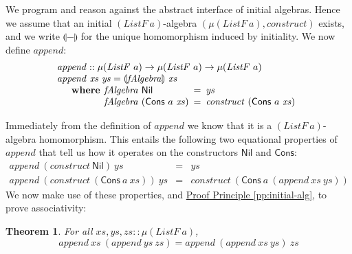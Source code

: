 \documentclass{jfp1}
\newcommand{\fold}[1]{\llparenthesis #1 \rrparenthesis}
\newtheorem{theorem}{Theorem}
\newcommand{\proofprinref}[1]{\hyperref[#1]{Proof Principle \ref*{#1}}}
\newcommand{\kw}[1]{\textbf{#1}}
\begin{document}
We program and reason against the abstract interface of initial
algebras. Hence we assume that an initial $(\mathit{ListF}~a)$-algebra
$(\mu(\mathit{ListF}~a), \mathit{construct})$ exists, and we write
$\fold{-}$ for the unique homomorphism induced by initiality. We now
define $\mathit{append}$:
\begin{displaymath}
  \begin{array}{l}
    \mathit{append} :: \mu(\mathit{ListF}~a) \to \mu(\mathit{ListF}~a) \to \mu(\mathit{ListF}~a) \\
    \mathit{append}~\mathit{xs}~\mathit{ys} = \fold{\mathit{fAlgebra}}~\mathit{xs} \\
    \quad\begin{array}{r@{\hspace{0.4em}}l@{\hspace{0.5em}}c@{\hspace{0.5em}}l}
      \kw{where} & \mathit{fAlgebra}~\mathsf{Nil} &=& \mathit{ys} \\
                     & \mathit{fAlgebra}~(\mathsf{Cons}~a~\mathit{xs}) &=& \mathit{construct}~(\mathsf{Cons}~a~\mathit{xs})
    \end{array}
  \end{array}
\end{displaymath}

Immediately from the definition of $\mathit{append}$ we know that it
is a $(\mathit{ListF}~a)$-algebra homomorphism. This entails the
following two equational properties of $\mathit{append}$ that tell us
how it operates on the constructors $\mathsf{Nil}$ and $\mathsf{Cons}$:
\begin{displaymath}
  \begin{array}{rcl}
    \mathit{append}~(\mathit{construct}~\mathsf{Nil})~\mathit{ys} & = & \mathit{ys} \\
    \mathit{append}~(\mathit{construct}~(\mathsf{Cons}~a~\mathit{xs}))~\mathit{ys} & = & \mathit{construct}~(\mathsf{Cons}~a~(\mathit{append}~\mathit{xs}~\mathit{ys}))
  \end{array}
\end{displaymath}
We now make use of these properties, and
\proofprinref{pp:initial-alg}, to prove associativity:

\begin{theorem}\label{thm:append-assoc}
  For all $\mathit{xs}, \mathit{ys}, \mathit{zs} :: \mu(\mathit{ListF}~a)$,
  \begin{displaymath}
    \mathit{append}~\mathit{xs}~(\mathit{append}~\mathit{ys}~\mathit{zs}) = \mathit{append}~(\mathit{append}~\mathit{xs}~\mathit{ys})~\mathit{zs}
  \end{displaymath}
\end{theorem}
\end{document}
